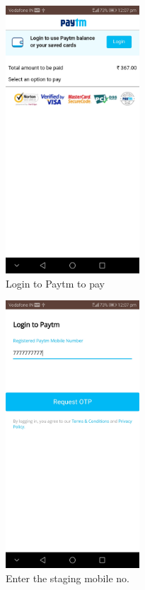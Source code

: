 \documentclass{report}
\begin{document}
\begin{figure}[h!]
\begin{subfigure}[h!]{.3\textwidth}
\centering
\includegraphics[width=5cm]{paytm_start.jpg}
\caption{\centering \tiny Login to Paytm to pay}
\end{subfigure}
\begin{subfigure}[h!]{.3\textwidth}
\centering
\includegraphics[width=5cm]{mobile_number.jpg}
\caption{\centering \tiny Enter the staging mobile no.}
\end{subfigure}
\begin{subfigure}[h!]{.3\textwidth}
\centering

\end{subfigure}
\end{figure}
\end{document}

